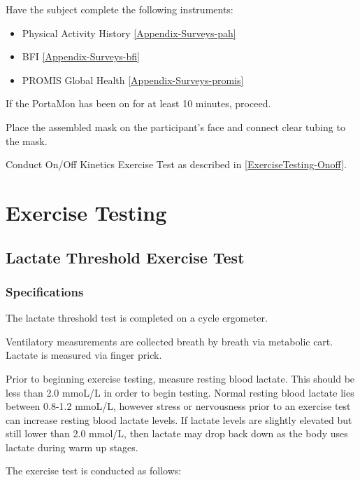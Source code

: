 \documentclass[
]{book}
\providecommand{\tightlist}{%
  \setlength{\itemsep}{0pt}\setlength{\parskip}{0pt}}
\begin{document}
Have the subject complete the following instruments:

\begin{itemize}
\tightlist
\item
  Physical Activity History \ref{Appendix-Surveys-pah}
\item
  BFI \ref{Appendix-Surveys-bfi}
\item
  PROMIS Global Health \ref{Appendix-Surveys-promis}
\end{itemize}

If the PortaMon has been on for at least 10 minutes, proceed.

Place the assembled mask on the participant's face and connect clear tubing to the mask.

Conduct On/Off Kinetics Exercise Test as described in \ref{ExerciseTesting-Onoff}.

\hypertarget{ExerciseTesting}{%
\chapter{Exercise Testing}\label{ExerciseTesting}}

\hypertarget{ExerciseTesting-LT}{%
\section{Lactate Threshold Exercise Test}\label{ExerciseTesting-LT}}

\hypertarget{ExerciseTesting-LT-Specs}{%
\subsection{Specifications}\label{ExerciseTesting-LT-Specs}}

The lactate threshold test is completed on a cycle ergometer.

Ventilatory measurements are collected breath by breath via metabolic cart.
Lactate is measured via finger prick.

Prior to beginning exercise testing, measure resting blood lactate. This should be less than 2.0 mmoL/L in order to begin testing. Normal resting blood lactate lies between 0.8-1.2 mmoL/L, however stress or nervousness prior to an exercise test can increase resting blood lactate levels. If lactate levels are slightly elevated but still lower than 2.0 mmol/L, then lactate may drop back down as the body uses lactate during warm up stages.

The exercise test is conducted as follows:
\end{document}
